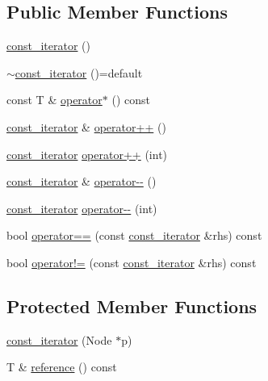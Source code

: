 \subsection*{Public Member Functions}
\begin{DoxyCompactItemize}
\item 
\mbox{\hyperlink{classsc_1_1list_1_1const__iterator_a54f14844dda37c2ebd95c7c6d7fe686d}{const\+\_\+iterator}} ()
\item 
\mbox{\hyperlink{classsc_1_1list_1_1const__iterator_a2a8ca8f4d9e7df000821825d0971c65b}{$\sim$const\+\_\+iterator}} ()=default
\item 
const T \& \mbox{\hyperlink{classsc_1_1list_1_1const__iterator_a24261f681d1a805b5c50a59b3242c0f2}{operator$\ast$}} () const
\item 
\mbox{\hyperlink{classsc_1_1list_1_1const__iterator}{const\+\_\+iterator}} \& \mbox{\hyperlink{classsc_1_1list_1_1const__iterator_abc6d5da99e4c689c662a0037b0bc9013}{operator++}} ()
\item 
\mbox{\hyperlink{classsc_1_1list_1_1const__iterator}{const\+\_\+iterator}} \mbox{\hyperlink{classsc_1_1list_1_1const__iterator_a6b724b61cbc4087c43836dced5eed52f}{operator++}} (int)
\item 
\mbox{\hyperlink{classsc_1_1list_1_1const__iterator}{const\+\_\+iterator}} \& \mbox{\hyperlink{classsc_1_1list_1_1const__iterator_aeb7c02bf76c6734253d09a5e2da94d9f}{operator-\/-\/}} ()
\item 
\mbox{\hyperlink{classsc_1_1list_1_1const__iterator}{const\+\_\+iterator}} \mbox{\hyperlink{classsc_1_1list_1_1const__iterator_aa4b38c471c0754e785c10a2e3aa0bf19}{operator-\/-\/}} (int)
\item 
bool \mbox{\hyperlink{classsc_1_1list_1_1const__iterator_a64650201a32eb1cbc7875e8e7a3434e1}{operator==}} (const \mbox{\hyperlink{classsc_1_1list_1_1const__iterator}{const\+\_\+iterator}} \&rhs) const
\item 
bool \mbox{\hyperlink{classsc_1_1list_1_1const__iterator_a2d271dbabdc3d2e47d1642a5e7beb84d}{operator!=}} (const \mbox{\hyperlink{classsc_1_1list_1_1const__iterator}{const\+\_\+iterator}} \&rhs) const
\end{DoxyCompactItemize}
\subsection*{Protected Member Functions}
\begin{DoxyCompactItemize}
\item 
\mbox{\hyperlink{classsc_1_1list_1_1const__iterator_a72c4f8d017e53d713629bec30ce0d1a9}{const\+\_\+iterator}} (Node $\ast$p)
\item 
T \& \mbox{\hyperlink{classsc_1_1list_1_1const__iterator_acc55cfde0e7405a0b4cf430ccac01a26}{reference}} () const
\end{DoxyCompactItemize}
